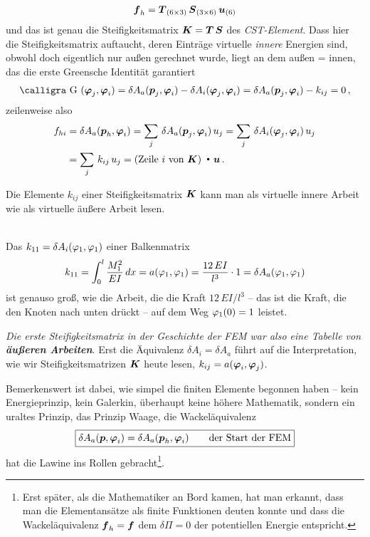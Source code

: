 \begin{align}
\mbox{\boldmath $f$}_h = \mbox{\boldmath $T$}_{(6 \times 3)}\,\mbox{\boldmath $S$}_{(3 \times 6)}\,\mbox{\boldmath $u$}_{(6)}
\end{align}
und das ist genau die Steifigkeitsmatrix $\mbox{\boldmath $K$} = \mbox{\boldmath $T$}\,\mbox{\boldmath $S$}$ des {\em CST-Element\/}. Dass hier die Steifigkeitsmatrix auftaucht, deren Eintr\"{a}ge virtuelle {\em innere\/} Energien sind, obwohl doch eigentlich nur \glq au{\ss}en\grq{} gerechnet wurde, liegt an dem \glq au{\ss}en = innen\grq{}, das die erste Greensche Identit\"{a}t garantiert
\begin{align}
\text{\normalfont\calligra G\,\,}(\vek \Np_j,\vek \Np_i) = \delta A_a(\vek p_j,\vek \Np_i) - \delta A_i(\vek \Np_j,\vek \Np_i) = \delta A_a(\vek p_j,\vek \Np_i)-  k_{ij} =0\,,
\end{align}
zeilenweise also
\begin{align}
f_{hi} &= \delta A_a(\mbox{\boldmath $p$}_h,\mbox{\boldmath $\varphi$}_i) = \sum_j\,\delta A_a(\mbox{\boldmath $p$}_j,\mbox{\boldmath $\varphi$}_i)\,u_j =  \sum_j\,\delta A_i(\mbox{\boldmath $\varphi$}_j,\mbox{\boldmath $\varphi$}_i)\,u_j \nonumber \\
&= \sum_j\,k_{ij}\,u_j = (\text{Zeile $i$ von $\mbox{\boldmath $K$}$) ${\,\scriptscriptstyle \stackrel{\bullet}{{}}}\,\,\mbox{\boldmath $u$}$}\,.
\end{align}

\hspace*{-12pt}\colorbox{highlightBlue}{\parbox{0.98\textwidth}{Die Elemente $k_{ij}$ einer Steifigkeitsmatrix $\mbox{\boldmath $K$}$ kann man als virtuelle innere Arbeit wie als virtuelle \"{a}u{\ss}ere Arbeit lesen.}}\\

Das $k_{11} = \delta A_i(\varphi_1,\varphi_1)$ einer Balkenmatrix
\begin{align}
 k_{11} = \int_{0}^{l}\frac{M_1^2}{EI}\,dx = a(\varphi_1,\varphi_1) = \frac{12\,EI}{l^3} \cdot 1 = \delta A_a(\varphi_1,\varphi_1)
\end{align}
ist genauso gro{\ss}, wie die Arbeit, die die Kraft $12\,EI/l^3$ -- das ist die Kraft, die den Knoten nach unten dr\"{u}ckt -- auf dem Weg $\varphi_1(0) = 1$ leistet.

{\em Die \glq erste\grq{} Steifigkeitsmatrix in der Geschichte der FEM war also eine Tabelle von {\bf \"{a}u{\ss}eren Arbeiten}\/}. Erst die \"{A}quivalenz $\delta A_i = \delta A_a$ f\"{u}hrt auf die Interpretation, wie wir Steifigkeitsmatrizen $\mbox{\boldmath $K$}$ heute lesen, $k_{ij} = a(\mbox{\boldmath $\varphi$}_i,\mbox{\boldmath $\varphi$}_j)$.

Bemerkenswert ist dabei, wie simpel die finiten Elemente begonnen haben -- kein Energieprinzip, kein Galerkin, \"{u}berhaupt keine h\"{o}here Mathematik, sondern ein uraltes Prinzip, das Prinzip Waage, die \glq Wackel\"{a}quivalenz\grq{}\,
\begin{align}
 \boxed{\delta A_a(\mbox{\boldmath $p$}, \mbox{\boldmath $\varphi$}_i) = \delta A_a(\mbox{\boldmath $p$}_h,\mbox{\boldmath $\varphi$}_i) \qquad \text{der Start der FEM}}
\end{align}
hat die Lawine ins Rollen gebracht\footnote{
Erst sp\"{a}ter, als die Mathematiker an Bord  kamen, hat man erkannt, dass man die Elementans\"{a}tze  als finite Funktionen deuten konnte und dass die Wackel\"{a}quivalenz $\mbox{\boldmath $f$}_h = \mbox{\boldmath $f$}$ dem $\delta \Pi = 0 $ der potentiellen Energie entspricht.}.




